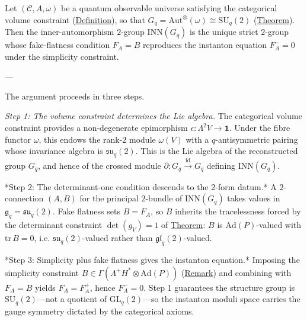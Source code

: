 \begin{proposition}
  \label{prop:emergence-to-fake-flat}
Let $(\mathcal{C}, A, \omega)$ be a quantum observable universe satisfying
the categorical volume constraint
(\hyperref[def:categorical-volume-constraint]{Definition}), so that
$G_q = \mathrm{Aut}^{\otimes}(\omega) \cong \mathrm{SU}_q(2)$
(\hyperref[thm:su2-emergence]{Theorem}). Then the inner-automorphism
$2$-group $\mathrm{INN}(G_q)$ is the unique strict $2$-group whose
fake-flatness condition $F_A = B$ reproduces the
instanton equation $F_A^{-} = 0$ under the simplicity constraint.

---

The argument proceeds in three steps.

\emph{Step 1: The volume constraint determines the Lie algebra.}
The categorical volume constraint provides a non-degenerate epimorphism
$\epsilon \colon \Lambda^2 V \to \mathbf{1}$. Under the fibre functor
$\omega$, this endows the rank-$2$ module $\omega(V)$ with a
$q$-antisymmetric pairing whose invariance algebra is
$\mathfrak{su}_q(2)$. This is the Lie algebra of the reconstructed
group $G_q$, and hence of the crossed module
$\partial \colon G_q \xrightarrow{\mathrm{id}} G_q$ defining
$\mathrm{INN}(G_q)$.

*Step 2: The determinant-one condition descends to the
2-form datum.*
A $2$-connection $(A, B)$ for the principal $2$-bundle of
$\mathrm{INN}(G_q)$ takes values in
$\mathfrak{g}_q = \mathfrak{su}_q(2)$. Fake
flatness sets $B = F_A$, so $B$ inherits the
tracelessness forced by the determinant constraint
$\det(g_V) = 1$ of \hyperref[thm:su2-emergence]{Theorem}: $B$ is
$\mathrm{Ad}(P)$-valued with $\mathrm{tr}\,B = 0$, i.e.
$\mathfrak{su}_q(2)$-valued rather than $\mathfrak{gl}_q(2)$-valued.

*Step 3: Simplicity plus fake flatness gives the instanton
equation.*
Imposing the simplicity constraint
$B \in \Gamma(\Lambda^+\!H^* \otimes \mathrm{Ad}(P))$
(\hyperref[rem:self-dual-2group]{Remark}) and combining with $F_A = B$
yields $F_A = F_A^+$, hence $F_A^- = 0$. Step 1 guarantees the
structure group is $\mathrm{SU}_q(2)$---not a quotient of
$\mathrm{GL}_q(2)$---so the instanton moduli space carries the
gauge symmetry dictated by the categorical axioms.
\end{proposition}
